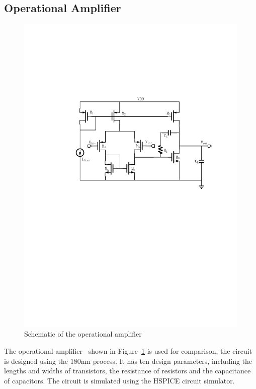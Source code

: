 \subsection{Operational Amplifier}


\begin{figure}[htbp]
    \begin{center}
        \centerline{\includegraphics[width=\columnwidth]{./img/sopam.pdf}}
        \caption{Schematic of the operational amplifier}
        \label{fig:schDAC2014}
    \end{center}
\end{figure}

The operational amplifier~\cite{wang2014enabling} shown in Figure~\ref{fig:schDAC2014} is used for
comparison, the circuit is designed using the 180nm process. It has ten design
parameters, including the lengths and widths of transistors, the resistance of
resistors and the capacitance of capacitors. The circuit is simulated using the
HSPICE circuit simulator.

